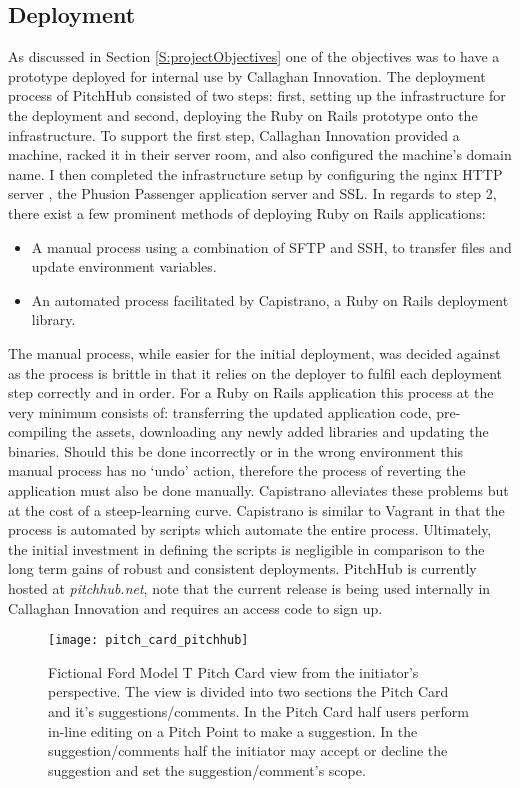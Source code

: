 \subsection{Deployment}
As discussed in Section \ref{S:projectObjectives} one of the objectives was to have a prototype deployed for internal use by Callaghan Innovation. The deployment process of PitchHub consisted of two steps: first, setting up the infrastructure for the deployment and second, deploying the Ruby on Rails prototype onto the infrastructure. To support the first step, Callaghan Innovation provided a machine, racked it in their server room, and also configured the machine's domain name. I then completed the infrastructure setup by configuring the nginx HTTP server \cite{nginx2:online}, the Phusion Passenger application server \cite{phusionPassenger:online} and SSL. In regards to step 2, there exist a few prominent methods of deploying Ruby on Rails applications:
\begin{itemize}
    \item A manual process using a combination of SFTP and SSH, to transfer files and update environment variables.
    \item An automated process facilitated by Capistrano, a Ruby on Rails deployment library.
\end{itemize}

The manual process, while easier for the initial deployment, was decided against as the process is brittle in that it relies on the deployer to fulfil each deployment step correctly and in order. For a Ruby on Rails application this process at the very minimum consists of: transferring the updated application code, pre-compiling the assets, downloading any newly added libraries and updating the binaries. Should this be done incorrectly or in the wrong environment this manual process has no `undo' action, therefore the process of reverting the application must also be done manually. Capistrano alleviates these problems but at the cost of a steep-learning curve. Capistrano is similar to Vagrant in that the process is automated by scripts which automate the entire process. Ultimately, the initial investment in defining the scripts is negligible in comparison to the long term gains of robust and consistent deployments. PitchHub is currently hosted at \textit{pitchhub.net}, note that the current release is being used internally in Callaghan Innovation and requires an access code to sign up.

\begin{sidewaysfigure}[ht]
    \centering
    \texttt{[image: pitch\_card\_pitchhub]}
    \caption{Fictional Ford Model T Pitch Card view from the initiator's perspective. The view is divided into two sections the Pitch Card and it's suggestions/comments. In the Pitch Card half users perform in-line editing on a Pitch Point to make a suggestion. In the suggestion/comments half the initiator may accept or decline the suggestion and set the suggestion/comment's scope.}
    \label{fig:pitch_card_pitchhub}
\end{sidewaysfigure}

